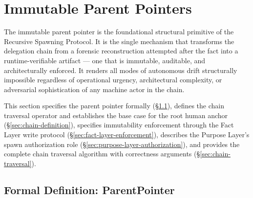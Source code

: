 \section{Immutable Parent Pointers}
\label{sec:immutable-parent-pointers}

The immutable parent pointer is the foundational structural primitive of the Recursive Spawning Protocol. It is the single mechanism that transforms the delegation chain from a forensic reconstruction attempted after the fact into a runtime-verifiable artifact — one that is immutable, auditable, and architecturally enforced. It renders all modes of autonomous drift structurally impossible regardless of operational urgency, architectural complexity, or adversarial sophistication of any machine actor in the chain.

This section specifies the parent pointer formally (\S\ref{sec:parent-pointer-formal}), defines the chain traversal operator and establishes the base case for the root human anchor (\S\ref{sec:chain-definition}), specifies immutability enforcement through the Fact Layer write protocol (\S\ref{sec:fact-layer-enforcement}), describes the Purpose Layer's spawn authorization role (\S\ref{sec:purpose-layer-authorization}), and provides the complete chain traversal algorithm with correctness arguments (\S\ref{sec:chain-traversal}).

\subsection{Formal Definition: ParentPointer}
\label{sec:parent-pointer-formal}

